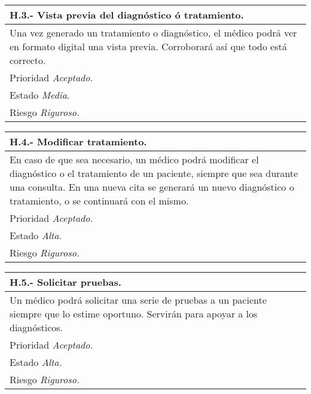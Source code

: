 	\begin{center}
	\begin{tabulary}{15cm}{|L|}
		\hline
			\bf{H.3.- Vista previa del diagnóstico ó tratamiento.} \\
		\hline
			Una vez generado un tratamiento o diagnóstico, el médico podrá ver en formato digital una vista previa. Corroborará así que todo está correcto. \\
		\hline
			Prioridad \textit{Aceptado.} \\
		\hline
			Estado \textit{Media.} \\
		\hline
			Riesgo \textit{Riguroso.} \\
		\hline
	\end{tabulary}
	\end{center}

	\begin{center}
	\begin{tabulary}{15cm}{|L|}
		\hline
			\bf{H.4.- Modificar tratamiento.} \\
		\hline
				En caso de que sea necesario, un médico podrá modificar el diagnóstico o el tratamiento de un paciente, siempre que sea durante una consulta. En una nueva cita se generará un nuevo diagnóstico o tratamiento, o se continuará con el mismo. \\
		\hline
			Prioridad \textit{Aceptado.} \\
		\hline
			Estado \textit{Alta.} \\
		\hline
			Riesgo \textit{Riguroso.} \\
		\hline
	\end{tabulary}
	\end{center}

	\begin{center}
	\begin{tabulary}{15cm}{|L|}
		\hline
			\bf{H.5.- Solicitar pruebas.} \\
		\hline
			Un médico podrá solicitar una serie de pruebas a un paciente siempre que lo estime oportuno. Servirán para apoyar a los diagnósticos. \\
		\hline
			Prioridad \textit{Aceptado.} \\
		\hline
			Estado \textit{Alta.} \\
		\hline
			Riesgo \textit{Riguroso.} \\
		\hline
	\end{tabulary}
	\end{center}

